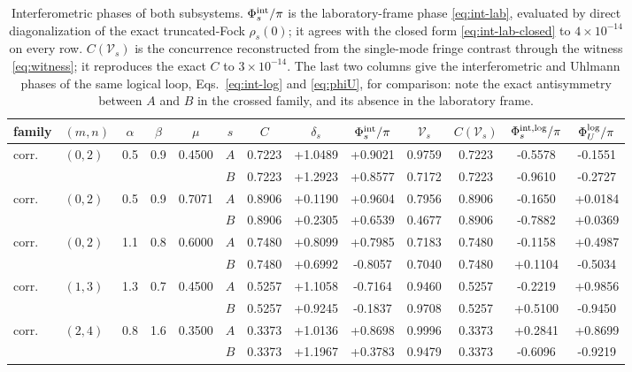 \documentclass[11pt]{article}
\begin{document}
\begin{table}[htbp]\centering
\caption{Interferometric phases of both subsystems. $\Phi^{\rm int}_s/\pi$ is the
laboratory-frame phase \eqref{eq:int-lab}, evaluated by direct diagonalization
of the exact truncated-Fock $\rho_s(0)$; it agrees with the closed form
\eqref{eq:int-lab-closed} to $4\times10^{-14}$ on every row.
$C(\mathcal V_s)$ is the concurrence reconstructed from the single-mode fringe
contrast through the witness \eqref{eq:witness}; it reproduces the exact $C$ to
$3\times10^{-14}$. The last two columns give the interferometric and Uhlmann
phases of the same logical loop, Eqs.~\eqref{eq:int-log} and \eqref{eq:phiU},
for comparison: note the exact antisymmetry between $A$ and $B$ in the crossed
family, and its absence in the laboratory frame.}
\label{tab:interf}
\footnotesize
\setlength{\tabcolsep}{3.2pt}
\begin{tabular}{llccccccccccc}
\toprule
family & $(m,n)$ & $\alpha$ & $\beta$ & $\mu$ & $s$ & $C$ & $\delta_s$ &
$\Phi^{\rm int}_s/\pi$ & $\mathcal V_s$ & $C(\mathcal V_s)$ &
$\Phi^{\rm int,log}_s/\pi$ & $\Phi_U^{\rm log}/\pi$\\
\midrule
corr. & $(0,2)$ & 0.5 & 0.9 & 0.4500 & $A$ & 0.7223 & +1.0489 & +0.9021 & 0.9759 & 0.7223 & -0.5578 & -0.1551\\
 &  &  &  &  & $B$ & 0.7223 & +1.2923 & +0.8577 & 0.7172 & 0.7223 & -0.9610 & -0.2727\\
\midrule
corr. & $(0,2)$ & 0.5 & 0.9 & 0.7071 & $A$ & 0.8906 & +0.1190 & +0.9604 & 0.7956 & 0.8906 & -0.1650 & +0.0184\\
 &  &  &  &  & $B$ & 0.8906 & +0.2305 & +0.6539 & 0.4677 & 0.8906 & -0.7882 & +0.0369\\
\midrule
corr. & $(0,2)$ & 1.1 & 0.8 & 0.6000 & $A$ & 0.7480 & +0.8099 & +0.7985 & 0.7183 & 0.7480 & -0.1158 & +0.4987\\
 &  &  &  &  & $B$ & 0.7480 & +0.6992 & -0.8057 & 0.7040 & 0.7480 & +0.1104 & -0.5034\\
\midrule
corr. & $(1,3)$ & 1.3 & 0.7 & 0.4500 & $A$ & 0.5257 & +1.1058 & -0.7164 & 0.9460 & 0.5257 & -0.2219 & +0.9856\\
 &  &  &  &  & $B$ & 0.5257 & +0.9245 & -0.1837 & 0.9708 & 0.5257 & +0.5100 & -0.9450\\
\midrule
corr. & $(2,4)$ & 0.8 & 1.6 & 0.3500 & $A$ & 0.3373 & +1.0136 & +0.8698 & 0.9996 & 0.3373 & +0.2841 & +0.8699\\
 &  &  &  &  & $B$ & 0.3373 & +1.1967 & +0.3783 & 0.9479 & 0.3373 & -0.6096 & -0.9219\\

\end{tabular}
\end{table}
\end{document}
